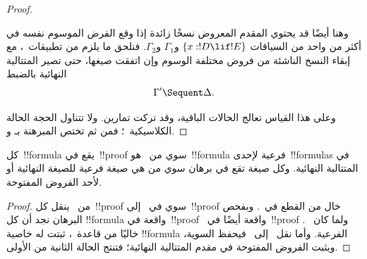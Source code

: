 \documentclass[../../../include/open-logic-section]{subfiles}
\begin{document}
\begin{proof}
\begin{enumerate}
  وهنا أيضًا قد يحتوي المقدم المعروض نسخًا زائدة إذا وقع الفرض الموسوم
  نفسه في أكثر من واحد من السياقات
  $\{x:!D \lif !E\}$ و$\Gamma_1$ و$\Gamma_2$. فنلحق ما يلزم من
  تطبيقات~\LeftR{\Contraction}، مع إبقاء النسخ الناشئة من فروض مختلفة
  الوسوم وإن اتفقت صيغها، حتى تصير المتتالية النهائية بالضبط
  \[
  \Gamma' \Sequent \Delta.
  \]

\end{enumerate}
وعلى هذا القياس تعالج الحالات الباقية، وقد تركت تمارين. ولا تتناول الحجة
الحالة الكلاسيكية~\FalseCl؛ فمن ثم تختص المبرهنة بـ و.
\end{proof}

\begin{cor}
كل~!!{formula} يقع في~!!{proof} سوي من~ هو~!!{formula} فرعية
لإحدى~!!{formula}s في المتتالية النهائية. وكل صيغة تقع في برهان سوي من
 هي صيغة فرعية للصيغة النهائية أو لأحد الفروض المفتوحة.
\end{cor}

\begin{proof}
  من~ ينقل كل~!!{proof} سوي في~
  إلى~!!{proof} خال من القطع في~. وبفحص البرهان نجد أن كل
  !!{formula} واقعة في~!!{proof}~ واقعة أيضًا في~!!{proof}
  . ولما كان~ خاليًا من قاعدة~\Cut{}، ثبتت له خاصية
  !!{formula} الفرعية. وأما نقل~ إلى~ فيحفظ السوية،
  ويثبت الفروض المفتوحة في مقدم المتتالية النهائية؛ فتنتج الحالة الثانية
  من الأولى.
\end{proof}
\end{document}
